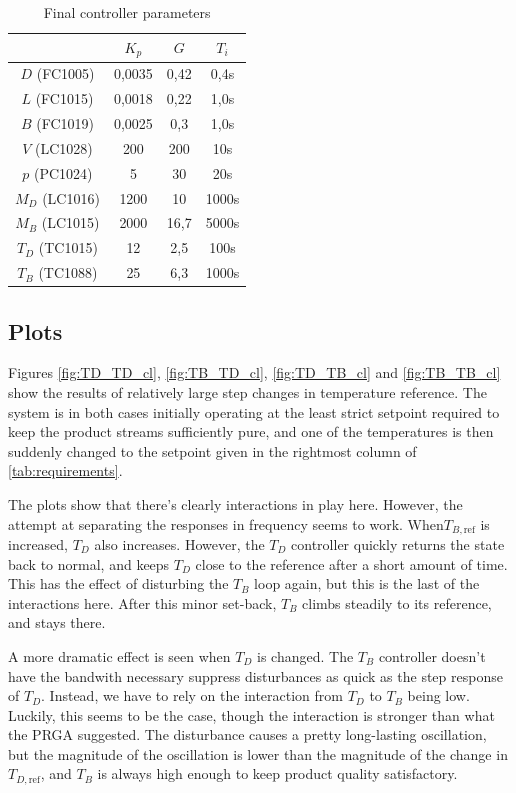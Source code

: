 \documentclass[12pt]{article}
\begin{document}
\begin{table}[p]
\centering
\begin{tabular}{c | c | c | c }
& $K_p$ & $G$ & $T_i$ \\ \hline
$D$ (FC1005) & 0,0035 & 0,42& 0,4s\\
$L$ (FC1015) & 0,0018 & 0,22 & 1,0s \\
$B$ (FC1019) & 0,0025 & 0,3 & 1,0s \\
$V$ (LC1028) & 200 & 200 & 10s \\
$p$ (PC1024) & 5 & 30 & 20s \\
$M_D$ (LC1016) & 1200 & 10 & 1000s \\
$M_B$ (LC1015) & 2000 & 16,7 & 5000s \\
$T_D$ (TC1015) & 12 & 2,5 & 100s \\
$T_B$ (TC1088) & 25 & 6,3 & 1000s
\end{tabular}
\caption{Final controller parameters}
\label{tab:final_controller_parameters}
\end{table}


\subsection{Plots}
Figures \ref{fig:TD_TD_cl}, \ref{fig:TB_TD_cl}, \ref{fig:TD_TB_cl} and \ref{fig:TB_TB_cl} show the results of relatively large step changes in temperature reference. The system is in both cases initially operating at the least strict setpoint required to keep the product streams sufficiently pure, and one of the temperatures is then suddenly changed to the setpoint given in the rightmost column of \ref{tab:requirements}.

The plots show that there's clearly interactions in play here. However, the attempt at separating the responses in frequency seems to work. When$T_{B , \textrm{ref}}$ is increased, $T_D$ also increases. However, the $T_D$ controller quickly returns the state back to normal, and keeps $T_D$ close to the reference after a short amount of time. This has the effect of disturbing the $T_B$ loop again, but this is the last of the interactions here. After this minor set-back, $T_B$ climbs steadily to its reference, and stays there.

A more dramatic effect is seen when $T_D$ is changed. The $T_B$ controller doesn't have the bandwith necessary suppress disturbances as quick as the step response of $T_D$. Instead, we have to rely on the interaction from $T_D$ to $T_B$ being low. Luckily, this seems to be the case, though the interaction is stronger than what the PRGA suggested. The disturbance causes a pretty long-lasting oscillation, but the magnitude of the oscillation is lower than the magnitude of the change in $T_{D , \textrm{ref}}$, and $T_B$ is always high enough to keep product quality satisfactory.
\end{document}

